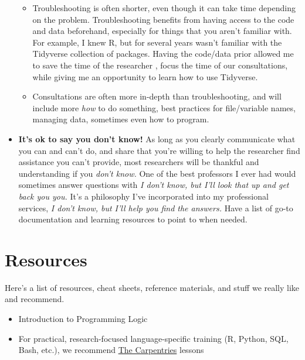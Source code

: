 \documentclass[
]{book}
\providecommand{\tightlist}{%
  \setlength{\itemsep}{0pt}\setlength{\parskip}{0pt}}
\begin{document}
\begin{itemize}
  \begin{itemize}
  \tightlist
  \item
    Troubleshooting is often shorter, even though
    it can take time depending on the problem. Troubleshooting benefits from having
    access to the code and data beforehand, especially for things that you aren't
    familiar with. For example, I knew R, but for several years wasn't familiar
    with the Tidyverse collection of packages. Having the code/data prior allowed me
    to save the time of the researcher \citep{wikipediaFiveLaws}, focus the time of our
    consultations, while
    giving me an opportunity to learn how to use Tidyverse.
  \item
    Consultations are often more in-depth than troubleshooting, and will include
    more \emph{how} to do something, best practices for file/variable names, managing
    data, sometimes even how to program.
  \end{itemize}
\item
  \textbf{It's ok to say you don't know!} As long as you clearly communicate what
  you can and can't do, and share that you're willing to help the researcher find
  assistance you can't provide, most researchers will be thankful and
  understanding if you \emph{don't know.} One of the best professors I ever had would
  sometimes answer questions with \emph{I don't know, but I'll look that up and get back
  you you.} It's a philosophy I've incorporated into my professional services,
  \emph{I don't know, but I'll help you find the answers.} Have a list of go-to documentation and learning resources to point to when needed.
\end{itemize}

\chapter{Resources}\label{resources}

Here's a list of resources, cheat sheets, reference materials, and stuff we really like and recommend.

\begin{itemize}
\tightlist
\item
  Introduction to Programming Logic \citep{lynne_ohanlon_introduction_2000}
\item
  For practical, research-focused language-specific training (R, Python, SQL, Bash, etc.), we recommend \href{https://carpentries.org/lessons/}{The Carpentries} lessons
\end{itemize}
\end{document}
